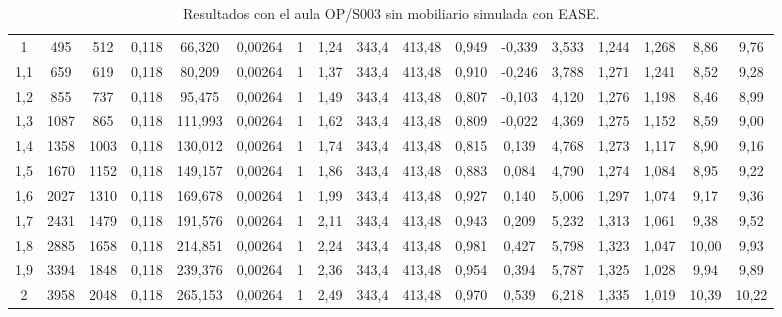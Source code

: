\begin{landscape}
\begin{table}[ht]
{\begin{tabular}{@{}ccccccccccccccccc@{}}
1 & 495 & 512 & 0,118 & 66,320 & 0,00264 & 1 & 1,24 & 343,4 & 413,48 & 0,949 & -0,339 & 3,533 & 1,244 & 1,268 & 8,86 & 9,76 \\
1,1 & 659 & 619 & 0,118 & 80,209 & 0,00264 & 1 & 1,37 & 343,4 & 413,48 & 0,910 & -0,246 & 3,788 & 1,271 & 1,241 & 8,52 & 9,28 \\
1,2 & 855 & 737 & 0,118 & 95,475 & 0,00264 & 1 & 1,49 & 343,4 & 413,48 & 0,807 & -0,103 & 4,120 & 1,276 & 1,198 & 8,46 & 8,99 \\
1,3 & 1087 & 865 & 0,118 & 111,993 & 0,00264 & 1 & 1,62 & 343,4 & 413,48 & 0,809 & -0,022 & 4,369 & 1,275 & 1,152 & 8,59 & 9,00 \\
1,4 & 1358 & 1003 & 0,118 & 130,012 & 0,00264 & 1 & 1,74 & 343,4 & 413,48 & 0,815 & 0,139 & 4,768 & 1,273 & 1,117 & 8,90 & 9,16 \\
1,5 & 1670 & 1152 & 0,118 & 149,157 & 0,00264 & 1 & 1,86 & 343,4 & 413,48 & 0,883 & 0,084 & 4,790 & 1,274 & 1,084 & 8,95 & 9,22 \\
1,6 & 2027 & 1310 & 0,118 & 169,678 & 0,00264 & 1 & 1,99 & 343,4 & 413,48 & 0,927 & 0,140 & 5,006 & 1,297 & 1,074 & 9,17 & 9,36 \\
1,7 & 2431 & 1479 & 0,118 & 191,576 & 0,00264 & 1 & 2,11 & 343,4 & 413,48 & 0,943 & 0,209 & 5,232 & 1,313 & 1,061 & 9,38 & 9,52 \\
1,8 & 2885 & 1658 & 0,118 & 214,851 & 0,00264 & 1 & 2,24 & 343,4 & 413,48 & 0,981 & 0,427 & 5,798 & 1,323 & 1,047 & 10,00 & 9,93 \\
1,9 & 3394 & 1848 & 0,118 & 239,376 & 0,00264 & 1 & 2,36 & 343,4 & 413,48 & 0,954 & 0,394 & 5,787 & 1,325 & 1,028 & 9,94 & 9,89 \\
2 & 3958 & 2048 & 0,118 & 265,153 & 0,00264 & 1 & 2,49 & 343,4 & 413,48 & 0,970 & 0,539 & 6,218 & 1,335 & 1,019 & 10,39 & 10,22 \\ \bottomrule
\end{tabular}
}
\caption{Resultados con el aula OP/S003 sin mobiliario simulada con EASE.}
\label{tablacompletaop}
\end{table}



\end{landscape}

